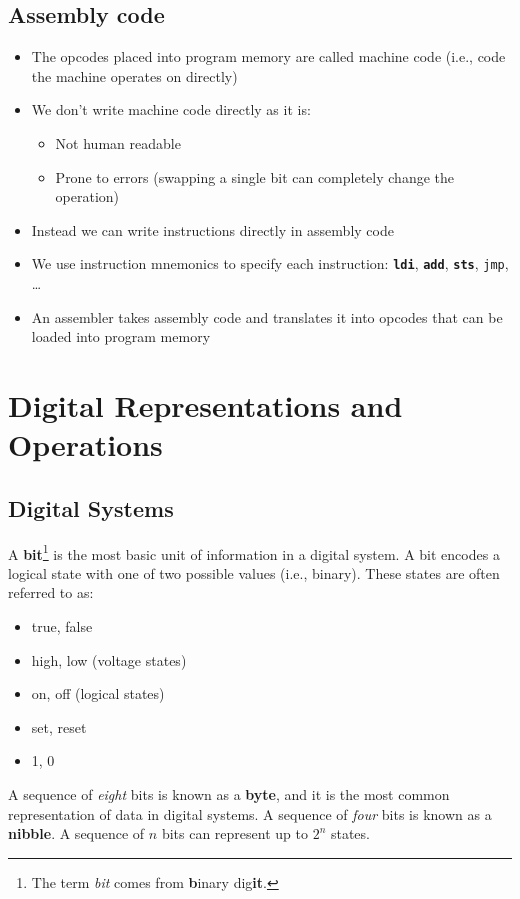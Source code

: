 \documentclass{report}
\newcommand{\keywordinline}[1]{\textcolor[rgb]{0.00,0.50,0.00}{\textbf{\texttt{#1}}}}
\begin{document}
\section{Assembly code}
\begin{itemize}
    \item The opcodes placed into program memory are called machine
          code (i.e., code the machine operates on directly)
    \item We don't write machine code directly as it is:
          \begin{itemize}
              \item Not human readable
              \item Prone to errors (swapping a single bit can
                    completely change the operation)
          \end{itemize}
    \item Instead we can write instructions directly in assembly code
    \item We use instruction mnemonics to specify each instruction:\@
          \keywordinline{ldi}, \keywordinline{add},
          \keywordinline{sts}, \texttt{jmp}, \dots
    \item An assembler takes assembly code and translates it into
          opcodes that can be loaded into program memory
\end{itemize}
\chapter{Digital Representations and Operations}
\section{Digital Systems}
A \textbf{bit}\footnote{The term \textit{bit} comes from
\textbf{b}inary dig\textbf{it}.} is the most basic unit of information
in a digital system. A bit encodes a logical state with one of two
possible values (i.e., binary). These states are often referred to as:
\begin{itemize}
    \item true, false
    \item high, low (voltage states)
    \item on, off (logical states)
    \item set, reset
    \item 1, 0
\end{itemize}
A sequence of \textit{eight} bits is known as a \textbf{byte}, and it is the most
common representation of data in digital systems.
A sequence of \textit{four} bits is known as a \textbf{nibble}.
A sequence of \(n\) bits can represent up to \(2^n\) states.
\end{document}
